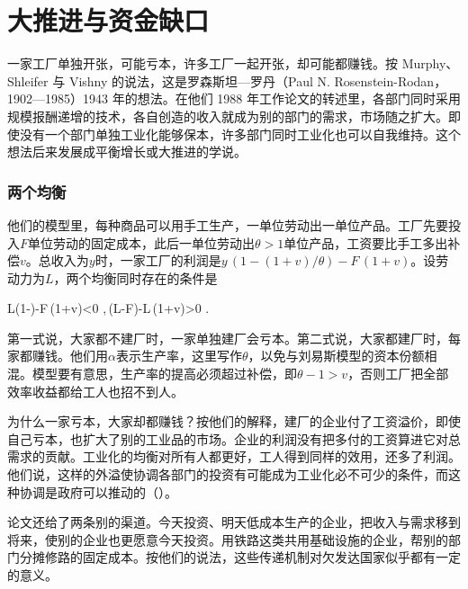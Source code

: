 \section{大推进与资金缺口}\label{sec:development-push}

一家工厂单独开张，可能亏本，许多工厂一起开张，却可能都赚钱。按 Murphy、Shleifer 与 Vishny 的说法，这是罗森斯坦—罗丹（Paul N. Rosenstein-Rodan，1902—1985）1943 年的想法\cite{msv1988,loc41,gnd41}。在他们 1988 年工作论文的转述里，各部门同时采用规模报酬递增的技术，各自创造的收入就成为别的部门的需求，市场随之扩大\cite{msv1988}。即使没有一个部门单独工业化能够保本，许多部门同时工业化也可以自我维持。这个想法后来发展成平衡增长或大推进的学说\cite{msv1988}。

\subsubsection{两个均衡}

他们的模型里，每种商品可以用手工生产，一单位劳动出一单位产品\cite{msv1988}。工厂先要投入$F$单位劳动的固定成本，此后一单位劳动出$\theta>1$单位产品，工资要比手工多出补偿$v$\cite{msv1988}。总收入为$y$时，一家工厂的利润是$y\,(1-(1+v)/\theta)-F\,(1+v)$。设劳动力为$L$，两个均衡同时存在的条件是
\begin{keyeq}
L\Bigl(1-\Bigr)-F\,(1+v)<0 ,\qquad \theta\,(L-F)-L\,(1+v)>0 .\label{eq:development-push}
\end{keyeq}
第一式说，大家都不建厂时，一家单独建厂会亏本。第二式说，大家都建厂时，每家都赚钱\cite{msv1988}。他们用$\alpha$表示生产率，这里写作$\theta$，以免与刘易斯模型的资本份额相混。模型要有意思，生产率的提高必须超过补偿，即$\theta-1>v$，否则工厂把全部效率收益都给工人也招不到人\cite{msv1988}。

为什么一家亏本，大家却都赚钱？按他们的解释，建厂的企业付了工资溢价，即使自己亏本，也扩大了别的工业品的市场\cite{msv1988}。企业的利润没有把多付的工资算进它对总需求的贡献。工业化的均衡对所有人都更好，工人得到同样的效用，还多了利润\cite{msv1988}。他们说，这样的外溢使协调各部门的投资有可能成为工业化必不可少的条件，而这种协调是政府可以推动的（）\cite{msv1988}。

论文还给了两条别的渠道\cite{msv1988}。今天投资、明天低成本生产的企业，把收入与需求移到将来，使别的企业也更愿意今天投资。用铁路这类共用基础设施的企业，帮别的部门分摊修路的固定成本\cite{msv1988}。按他们的说法，这些传递机制对欠发达国家似乎都有一定的意义\cite{msv1988}。

